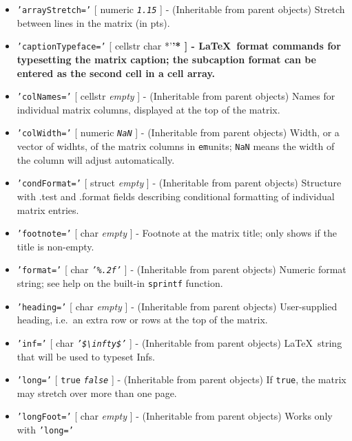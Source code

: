  \begin{itemize}
 \item
   \texttt{'arrayStretch='} {[} numeric \textbar{} \emph{\texttt{1.15}}
   {]} - (Inheritable from parent objects) Stretch between lines in the
   matrix (in pts).
 \item
   \texttt{'captionTypeface='} {[} cellstr \textbar{} char \textbar{}
   *'\large\bfseries'* ] - \LaTeX\
   format commands for typesetting the matrix caption; the subcaption format
   can be entered as the second cell in a cell array.
 \item
   \texttt{'colNames='} {[} cellstr \textbar{} \emph{empty} {]} -
   (Inheritable from parent objects) Names for individual matrix columns,
   displayed at the top of the matrix.
 \item
   \texttt{'colWidth='} {[} numeric \textbar{} \emph{\texttt{NaN}} {]} -
   (Inheritable from parent objects) Width, or a vector of widhts, of the
   matrix columns in \texttt{em}units; \texttt{NaN} means the width of
   the column will adjust automatically.
 \item
   \texttt{'condFormat='} {[} struct \textbar{} \emph{empty} {]} -
   (Inheritable from parent objects) Structure with .test and .format
   fields describing conditional formatting of individual matrix entries.
 \item
   \texttt{'footnote='} {[} char \textbar{} \emph{empty} {]} - Footnote
   at the matrix title; only shows if the title is non-empty.
 \item
   \texttt{'format='} {[} char \textbar{} \emph{\texttt{'\%.2f'}} {]} -
   (Inheritable from parent objects) Numeric format string; see help on
   the built-in \texttt{sprintf} function.
 \item
   \texttt{'heading='} {[} char \textbar{} \emph{empty} {]} -
   (Inheritable from parent objects) User-supplied heading, i.e.~an extra
   row or rows at the top of the matrix.
 \item
   \texttt{'inf='} {[} char \textbar{}
   \emph{\texttt{'\$\textbackslash{}infty\$'}} {]} - (Inheritable from
   parent objects) \LaTeX~string that will be used to typeset Infs.
 \item
   \texttt{'long='} {[} \texttt{true} \textbar{} \emph{\texttt{false}}
   {]} - (Inheritable from parent objects) If \texttt{true}, the matrix
   may stretch over more than one page.
 \item
   \texttt{'longFoot='} {[} char \textbar{} \emph{empty} {]} -
   (Inheritable from parent objects) Works only with \texttt{'long='}

\end{itemize}
